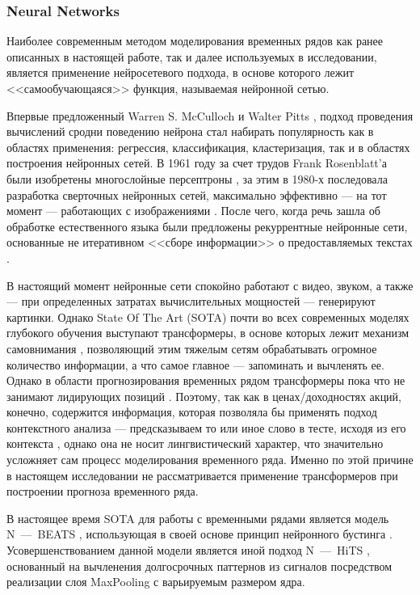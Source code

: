 \subsubsection{Neural Networks} \label{link::neural_networks}
Наиболее современным методом моделирования временных рядов как ранее описанных в настоящей работе, так и далее используемых в исследовании, является применение нейросетевого подхода, в основе которого лежит <<самообучающаяся>> функция, называемая нейронной сетью. 

Впервые предложенный Warren S. McCulloch и Walter Pitts \cite{mcculloch1943logical}, подход проведения вычислений сродни поведению нейрона стал набирать популярность как в областях применения: регрессия, классификация, кластеризация, так и в областях построения нейронных сетей. В 1961 году за счет трудов Frank Rosenblatt'а были изобретены многослойные персептроны \cite{rosenblatt1961principles}, за этим в 1980-х последовала разработка сверточных нейронных сетей, максимально эффективно --- на тот момент --- работающих с изображениями \cite{lecun1989backpropagation, lecun2015deep, lecun1989generalization}. После чего, когда речь зашла об обработке естественного языка были предложены рекуррентные нейронные сети, основанные не итеративном <<сборе информации>> о предоставляемых текстах \cite{hochreiter1997long, rumelhart1986learning}. 

В настоящий момент нейронные сети спокойно работают с видео, звуком, а также --- при определенных затратах вычислительных мощностей --- генерируют картинки. Однако State Of The Art (SOTA) почти во всех современных моделях глубокого обучения выступают трансформеры, в основе которых лежит механизм самовнимания \cite{attention_transformers}, позволяющий этим тяжелым сетям обрабатывать огромное количество информации, а что самое главное --- запоминать и вычленять ее. Однако в области прогнозирования временных рядом трансформеры пока что не занимают лидирующих позиций \cite{transformers_are_useless_for_TSF}.  Поэтому, так как в ценах/доходностях акций, конечно, содержится информация, которая позволяла бы применять подход контекстного анализа --- предсказываем то или иное слово в тесте, исходя из его контекста \cite{word2vec_2013}, однако она не носит лингвистический характер, что значительно усложняет сам процесс моделирования временного ряда. Именно по этой причине в настоящем исследовании не рассматривается применение трансформеров при построении прогноза временного ряда.

В настоящее время SOTA для работы с временными рядами является модель N~---~BEATS \cite{oreshkin2019n}, использующая в своей основе принцип нейронного бустинга \cite{schapire2003boosting}. Усовершенствованием данной модели является иной подход N~---~HiTS \cite{challu2022n}, основанный на вычленения долгосрочных паттернов из сигналов посредством реализации слоя MaxPooling с варьируемым размером ядра.


